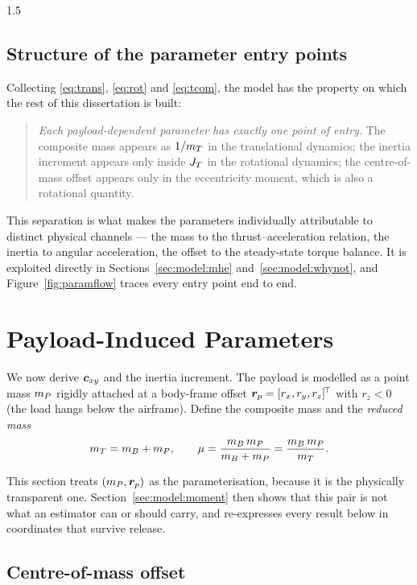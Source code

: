\begin{spacing}{1.5}
\subsection{Structure of the parameter entry points}\label{sec:model:entry}

Collecting \eqref{eq:trans}, \eqref{eq:rot} and \eqref{eq:tcom}, the model has
the property on which the rest of this dissertation is built:

\begin{quote}
\emph{Each payload-dependent parameter has exactly one point of entry.} The
composite mass appears as $1/m_T$ in the translational dynamics; the inertia
increment appears only inside $J_T$ in the rotational dynamics; the
centre-of-mass offset appears only in the eccentricity moment, which is also a
rotational quantity.
\end{quote}

This separation is what makes the parameters individually attributable to
distinct physical channels --- the mass to the thrust--acceleration relation, the
inertia to angular acceleration, the offset to the steady-state torque balance.
It is exploited directly in Sections~\ref{sec:model:mhe}
and~\ref{sec:model:whynot}, and Figure~\ref{fig:paramflow} traces every entry
point end to end.

\section{Payload-Induced Parameters}\label{sec:model:payload}

We now derive $\bm{c}_{xy}$ and the inertia increment. The payload is modelled as a
point mass $m_P$ rigidly attached at a body-frame offset
$\bm{r}_p = [r_x, r_y, r_z]^{\!\top}$ with $r_z < 0$ (the load hangs below the
airframe). Define the composite mass and the \emph{reduced mass}
\begin{equation}
m_T = m_B + m_P,
\qquad
\mu = \frac{m_B\, m_P}{m_B + m_P} = \frac{m_B\, m_P}{m_T}.
\label{eq:mu}
\end{equation}

This section treats $(m_P,\bm{r}_p)$ as the parameterisation, because it is the
physically transparent one. Section~\ref{sec:model:moment} then shows that this
pair is not what an estimator can or should carry, and re-expresses every result
below in coordinates that survive release.

\subsection{Centre-of-mass offset}\label{sec:model:com}


\end{spacing}
